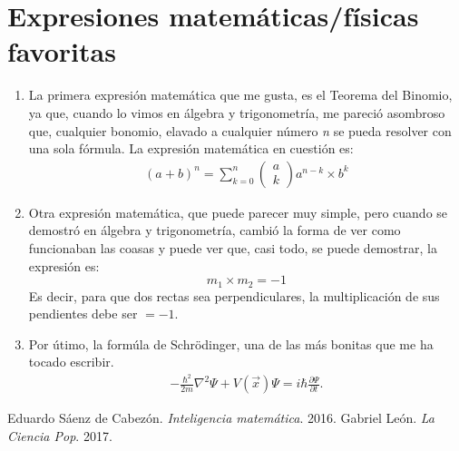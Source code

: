 \documentclass[12pt]{article}
\begin{document}
\section{Expresiones matemáticas/físicas favoritas}
	\begin{enumerate}
		\item La primera expresión matemática que me gusta, es el Teorema del Binomio, ya que, cuando lo vimos en álgebra y trigonometría, me pareció asombroso que, cualquier bonomio, elavado a cualquier número \emph{n} se pueda resolver con una sola fórmula. La expresión matemática en cuestión es:
		\begin{align*}
			(a+b)^{n} = \sum^{n}_{k=0} \begin{pmatrix}
		a \\ k \end{pmatrix} a^{n-k} \times b^{k}
		\end{align*}
		\item Otra expresión matemática, que puede parecer muy simple, pero cuando se demostró en álgebra y trigonometría, cambió la forma de ver como funcionaban las coasas y puede ver que, casi todo, se puede demostrar, la expresión es: 
		\begin{equation*}
		m_{1} \times m_{2} = -1
		\end{equation*}
		Es decir, para que dos rectas sea perpendiculares, la multiplicación de sus pendientes debe ser $=-1$.
		\item Por útimo, la formúla de Schrödinger, una de las más bonitas que me ha tocado escribir. 
		\begin{align*}
		-\frac{\hbar^2}{2m}\nabla^2\Psi+V(\vec{x}) \Psi=i\hbar\frac{\partial\Psi}{\partial t}.
		\end{align*}
	\end{enumerate}
\begin{thebibliography}{99}
	 Eduardo Sáenz de Cabezón. \emph{Inteligencia matemática}. 2016.
	 Gabriel León. \emph{La Ciencia Pop}. 2017.
\end{thebibliography}
\end{document}
